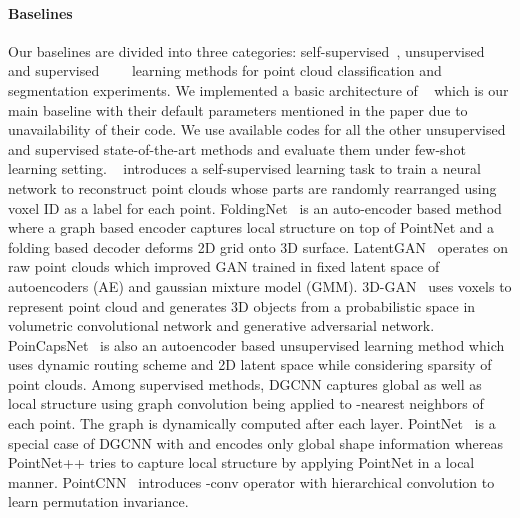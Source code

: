 \documentclass{article}
\begin{document}
\paragraph{Baselines}
Our baselines are divided into three categories: self-supervised~\cite{sauder2019self}, unsupervised~\cite{yang2018foldingnet}~\cite{achlioptas2018learning}~\cite{han2019view} and supervised~\cite{dgcnn}~\cite{qi2017pointnet}~\cite{qi2017pointnet++}~\cite{li2018pointcnn} learning methods for point cloud classification and segmentation experiments.  We implemented a basic architecture of ~\cite{sauder2019self} which is our main baseline with their default parameters mentioned in the paper due to unavailability of their code. We use available codes for all the other unsupervised and supervised state-of-the-art methods and evaluate them under few-shot learning setting. ~\cite{sauder2019self} introduces a self-supervised learning task to train a neural network to reconstruct point clouds whose parts are randomly rearranged using voxel ID as a label for each point. FoldingNet~\cite{yang2018foldingnet} is an auto-encoder based method where a graph based encoder captures local structure on top of PointNet and a folding based decoder deforms 2D grid onto 3D surface. LatentGAN~\cite{achlioptas2018learning} operates on raw point clouds which improved GAN trained in fixed latent space of autoencoders (AE) and gaussian mixture model (GMM). 3D-GAN~\cite{wu2016learning} uses voxels to represent point cloud and generates 3D objects from a probabilistic space in volumetric convolutional network and generative adversarial network. PoinCapsNet~\cite{zhao20193d} is also an autoencoder based unsupervised learning method which uses dynamic routing scheme and 2D latent space while considering sparsity of point clouds. Among supervised methods, DGCNN\cite{dgcnn} captures global as well as local structure using graph convolution being applied to -nearest neighbors of each point. The graph is dynamically computed after each layer. PointNet~\cite{qi2017pointnet} is a special case of DGCNN with  and encodes only global shape information whereas PointNet++\cite{qi2017pointnet++} tries to capture local structure by applying PointNet in a local manner. PointCNN~\cite{li2018pointcnn} introduces -conv operator with hierarchical convolution to learn permutation invariance. 
\fi
\end{document}
